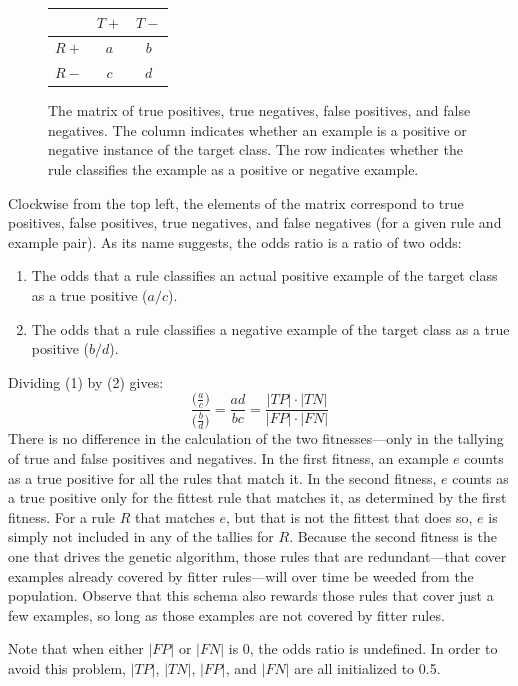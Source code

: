 \documentclass[11pt]{article}
\begin{document}
\begin{figure}
\centering
\begin{tabular}{c|cc}
& $T+$ & $T-$ \\
\hline
$R+$ & $a$ & $b$ \\
$R-$ & $c$ & $d$ \\
\end{tabular}
\caption{The matrix of true positives, true negatives, false positives, and false negatives. The column indicates whether an example is a positive or negative instance of the target class. The row indicates whether the rule classifies the example as a positive or negative example.}
\label{odds_ratio}
\end{figure}
Clockwise from the top left, the elements of the matrix correspond to true positives, false positives, true negatives, and false negatives (for a given rule and example pair). As its name suggests, the odds ratio is a ratio of two odds:

\begin{enumerate}
\item The odds that a rule classifies an actual positive example of the target class as a true positive ($a/c$).
\item The odds that a rule classifies a negative example of the target class as a true positive ($b/d$).
\end{enumerate}
Dividing (1) by (2) gives:
$$\frac{\Big(\frac{a}{c}\Big)}{\Big(\frac{b}{d}\Big)} = \frac{ad}{bc} = \frac{|TP| \cdot |TN|}{|FP| \cdot |FN|}$$
There is no difference in the calculation of the two fitnesses---only in the tallying of true and false positives and negatives. In the first fitness, an example $e$ counts as a true positive for all the rules that match it. In the second fitness, $e$ counts as a true positive only for the fittest rule that matches it, as determined by the first fitness. For a rule $R$ that matches $e$, but that is not the fittest that does so, $e$ is simply not included in any of the tallies for $R$. Because the second fitness is the one that drives the genetic algorithm, those rules that are redundant---that cover examples already covered by fitter rules---will over time be weeded from the population. Observe that this schema also rewards those rules that cover just a few examples, so long as those examples are not covered by fitter rules.

Note that when either $|FP|$ or $|FN|$ is 0, the odds ratio is undefined. In order to avoid this problem, $|TP|$, $|TN|$, $|FP|$, and $|FN|$ are all initialized to 0.5.
\end{document}
